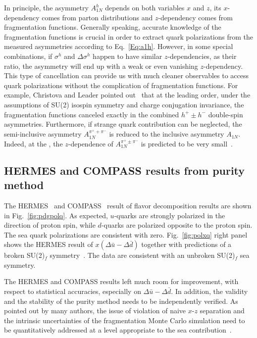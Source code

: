 In principle, the asymmetry $A_{1N}^h$ depends on both
variables $x$ and $z$, its $x$-dependency comes from parton distributions and
$z$-dependency comes from fragmentation functions. 
Generally speaking, accurate knowledge of
the fragmentation functions is crucial in order to extract quark polarizations from the measured
asymmetries according to Eq.~\ref{Eq:a1h}.  However, in some special combinations, if $\sigma^h$ and
$\Delta \sigma^h$ happen to have similar $z$-dependencies, as their ratio, the asymmetry  
will end up with a weak or even vanishing $z$-dependency. This type of cancellation can provide
 us with much cleaner
 observables to access quark polarizations without the complication of fragmentation functions. 
For example,     
Christova and Leader pointed out~\cite{leader2} that at the leading order, 
under the assumptions of SU(2) isospin symmetry and charge conjugation invariance, 
the fragmentation functions 
canceled exactly in the combined $h^+ \pm h^-$ double-spin
asymmetries. Furthermore, if strange quark contribution can be neglected, 
the semi-inclusive asymmetry $A_{1N}^{\pi^+ + \pi^-}$ is reduced
to the inclusive asymmetry $A_{1N}$.  
Indeed, at the \nloo, the 
$z$-dependence of $A_{1N}^{\pi^+ \pm \pi^-}$
is predicted to be very small~\cite{sassotnlo}.

\subsection{HERMES and COMPASS results from \lo purity method }
The HERMES~\cite{Airapetian:2004zf} and COMPASS~\cite{Alekseev:2010ub} result of flavor decomposition results are shown 
in Fig.~\ref{fig:pdgpolq}. 
As expected, $u$-quarks are strongly polarized in the direction of 
proton spin, while $d$-quarks are polarized 
opposite to the proton spin.  The sea quark polarizations are consistent with zero. 
Fig.~\ref{fig:polxq} right panel shows the HERMES result of $x(\Delta\bar{u} -
\Delta\bar{d})$ together with predictions of a broken SU(2)$_f$
symmetry~\cite{lit:goeke,cao}.  The data are
consistent with an unbroken SU(2)$_f$ sea symmetry.   

The HERMES and COMPASS results left much room for improvement, with respect to statistical accuracies, 
especially on $\Delta \bar{u}- \Delta \bar{d}$.
In addition, the validity and the stability of the \lo purity method needs 
to be independently verified. As pointed out by many authors, the issue of
\lo violation of naive $x$-$z$ separation and the intrinsic uncertainties of the 
fragmentation Monte Carlo simulation need to be quantitatively addressed
at a level appropriate to the sea contribution~\cite{leader2}.

